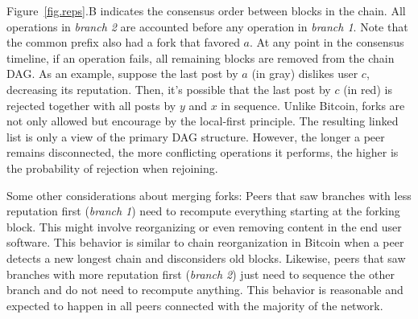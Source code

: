 \documentclass[10pt,journal,compsoc]{IEEEtran}
\newcommand{\reps}      {\emph{reps}\xspace}
\begin{document}

Figure~\ref{fig.reps}.B indicates the consensus order between blocks in the
chain.
All operations in \emph{branch 2} are accounted before any operation in
\emph{branch 1}.
Note that the common prefix also had a fork that favored $a$.
%
At any point in the consensus timeline, if an operation fails, all remaining
blocks are removed from the chain DAG.
As an example, suppose the last post by $a$ (in gray) dislikes user $c$,
decreasing its reputation.
Then, it's possible that the last post by $c$ (in red) is rejected together
with all posts by $y$ and $x$ in sequence.
%
Unlike Bitcoin, forks are not only allowed but encourage by the local-first
principle.
The resulting linked list is only a view of the primary DAG structure.
However, the longer a peer remains disconnected, the more conflicting
operations it performs, the higher is the probability of rejection when
rejoining.

Some other considerations about merging forks:
Peers that saw branches with less reputation first (\emph{branch 1}) need to
recompute everything starting at the forking block.
This might involve reorganizing or even removing content in the end user
software.
This behavior is similar to chain reorganization in Bitcoin when a peer detects
a new longest chain and disconsiders old blocks.
%
Likewise, peers that saw branches with more reputation first (\emph{branch 2})
just need to sequence the other branch and do not need to recompute anything.
This behavior is reasonable and expected to happen in all peers connected with
the majority of the network.

\end{document}
